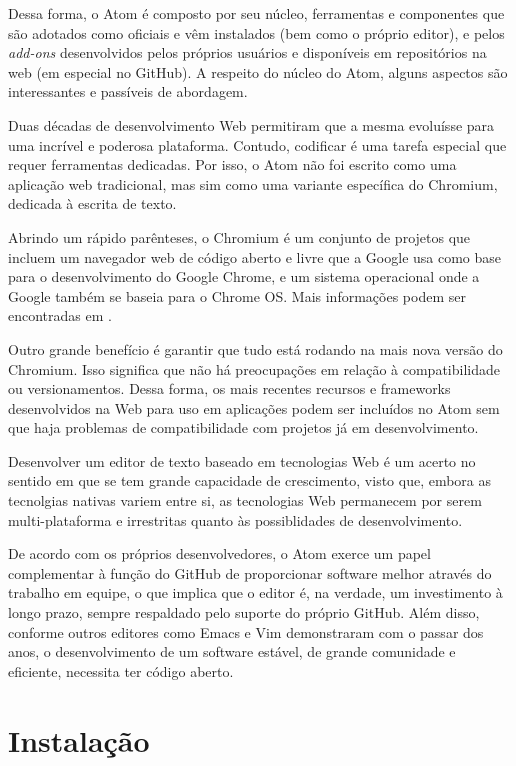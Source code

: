 	Dessa forma, o Atom é composto por seu núcleo, ferramentas e componentes que são adotados como oficiais e vêm instalados (bem como o próprio editor), e pelos \textit{add-ons} desenvolvidos pelos próprios usuários e disponíveis em repositórios na web (em especial no GitHub). A respeito do núcleo do Atom, alguns aspectos são interessantes e passíveis de abordagem.

	Duas décadas de desenvolvimento Web permitiram que a mesma evoluísse para uma incrível e poderosa plataforma. Contudo, codificar é uma tarefa especial que requer ferramentas dedicadas. Por isso, o Atom não foi escrito como uma aplicação web tradicional, mas sim como uma variante específica do Chromium, dedicada à escrita de texto.

	Abrindo um rápido parênteses, o Chromium é um conjunto de projetos que incluem um navegador web de código aberto e livre que a Google usa como base para o desenvolvimento do Google Chrome, e um sistema operacional onde a Google também se baseia para o Chrome OS. Mais informações podem ser encontradas em \cite{doc:chromium}.

	Outro grande benefício é garantir que tudo está rodando na mais nova versão do Chromium. Isso significa que não há preocupações em relação à compatibilidade ou versionamentos. Dessa forma, os mais recentes recursos e frameworks desenvolvidos na Web para uso em aplicações podem ser incluídos no Atom sem que haja problemas de compatibilidade com projetos já em desenvolvimento.

	Desenvolver um editor de texto baseado em tecnologias Web é um acerto no sentido em que se tem grande capacidade de crescimento, visto que, embora as tecnolgias nativas variem entre si, as tecnologias Web permanecem por serem multi-plataforma e irrestritas quanto às possiblidades de desenvolvimento.

	De acordo com os próprios desenvolvedores, o Atom exerce um papel complementar à função do GitHub de proporcionar software melhor através do trabalho em equipe, o que implica que o editor é, na verdade, um investimento à longo prazo, sempre respaldado pelo suporte do próprio GitHub. Além disso, conforme outros editores como Emacs e Vim demonstraram com o passar dos anos, o desenvolvimento de um software estável, de grande comunidade e eficiente, necessita ter código aberto.

	\section{Instalação}

